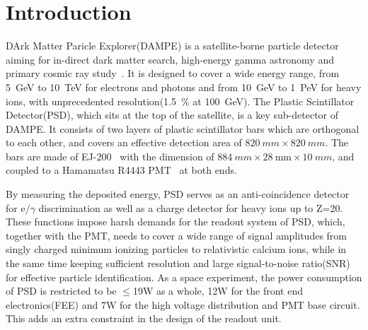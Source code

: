 \documentclass[5p, times]{elsarticle}
\begin{document}
\linenumbers
\section{Introduction}
\label{sec:introduction}

DArk Matter Paricle Explorer(DAMPE) is a satellite-borne particle detector aiming for in-direct dark matter search, high-energy gamma astronomy and primary cosmic ray study~\cite{Chang_Jin_dampe}.
It is designed to cover a wide energy range, from \SI{5}{GeV} to \SI{10}{TeV} for electrons and photons and from \SI{10}{GeV} to \SI{1}{PeV} for heavy ions, with unprecedented resolution(\SI{1.5}{\percent} at \SI{100}{\giga\electronvolt}).
The Plastic Scintillator Detector(PSD), which sits at the top of the satellite, is a key sub-detector of DAMPE.
It consists of two layers of plastic scintillator bars which are orthogonal to each other, and covers an effective detection area of $\SI{820}{mm}\times\SI{820}{mm}$.
The bars are made of EJ-200~\cite{scintillator} with the dimension of $\SI{884}{mm} \times \SI{28}{\milli\meter} \times \SI{10}{mm}$, and coupled to a Hamamatsu R4443 PMT~\cite{r4443} at both ends.

By measuring the deposited energy, PSD serves as an anti-coincidence detector for e/$\gamma$ discrimination as well as a charge detector for heavy ions up to Z=20.
These functions impose harsh demands for the readout system of PSD, which, together with the PMT, needs to cover a wide range of signal amplitudes from singly charged minimum ionizing particles to relativistic calcium ions, while in the same time keeping sufficient resolution and large signal-to-noise ratio(SNR) for effective particle identification.   
As a space experiment, the power consumption of PSD is restricted to be $\leq$19W as a whole, 12W for the front end electronics(FEE) and 7W for the high voltage distribution and PMT base circuit.
This adds an extra constraint in the design of the readout unit.
\end{document}
